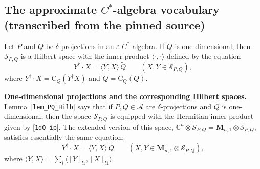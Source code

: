 
\subsection*{The approximate $C^{*}$-algebra vocabulary (transcribed from the pinned source)}

\hypertarget{def:column-hilbert-corner}{}%
\begin{definition}\label{def:column-hilbert-corner}
Let $P$ and $Q$ be $\delta$-projections in an $\varepsilon$-$C^*$ algebra. If $Q$ is one-dimensional, then $\mathcal{S}_{P,Q}$ is a Hilbert space with the inner product $\langle{\cdot},{\cdot}\rangle$ defined by the equation
\begin{equation*}
Y^\dagger\cdot X=\langle{Y},{X}\rangle\,\widetilde{Q}\qquad (X,Y\in\mathcal{S}_{P,Q}),
\end{equation*}
where $Y^\dagger\cdot X=\mathrm{C}_{Q}(Y^{\dagger}X)$ and $\widetilde{Q}=\mathrm{C}_Q(Q)$.

\noindent\textbf{One-dimensional projections and the corresponding Hilbert spaces.} Lemma~\textup{[\texttt{lem\_PQ\_Hilb}]} says that if $P,Q\in\mathcal{A}$ are $\delta$-projections and $Q$ is one-dimensional, then the space $\mathcal{S}_{P,Q}$ is equipped with the Hermitian inner product given by \textup{[\texttt{1dQ\_ip}]}. The extended version of this space, $\mathbb{C}^n\otimes\mathcal{S}_{P,Q}=\mathbf{M}_{n,1}\otimes\mathcal{S}_{P,Q}$, satisfies essentially the same equation:
\begin{equation*}
Y^\dagger\cdot X=\langle{Y},{X}\rangle\,\widetilde{Q}\qquad (X,Y\in\mathbf{M}_{n,1}\otimes\mathcal{S}_{P,Q}),
\end{equation*}
where $\langle{Y},{X}\rangle=\sum_{l}\langle{[Y]_{l1}},{[X]_{l1}}\rangle$.
\end{definition}
